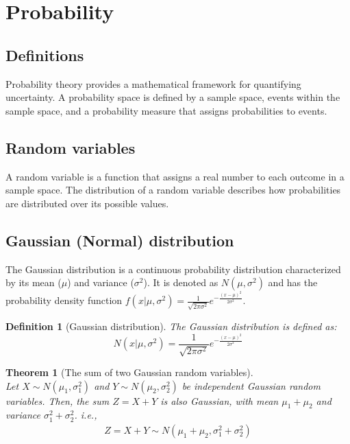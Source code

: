 \documentclass[11pt]{book} %
\newtheorem{theorem}{Theorem}[section]
\newtheorem{definition}{Definition}[section]
\begin{document}
\section{Probability}

\subsection{Definitions}

Probability theory provides a mathematical framework for quantifying uncertainty. 
A probability space is defined by a sample space, events within the sample space, and a probability measure that assigns probabilities to events.

\subsection{Random variables}

A random variable is a function that assigns a real number to each outcome in a sample space. 
The distribution of a random variable describes how probabilities are distributed over its possible values.

\subsection{Gaussian (Normal) distribution}

The Gaussian distribution is a continuous probability distribution characterized by its mean (\(\mu\)) and variance (\(\sigma^2\)). 
It is denoted as \(N(\mu, \sigma^2)\) and has the probability density function \(f(x | \mu, \sigma^2) = \frac{1}{\sqrt{2\pi\sigma^2}} e^{-\frac{(x-\mu)^2}{2\sigma^2}}\).

\begin{definition}[Gaussian distribution]
    The Gaussian distribution is defined as:
    \begin{equation}
        N(x | \mu, \sigma^2) = \frac{1}{\sqrt{2\pi\sigma^2}} e^{-\frac{(x-\mu)^2}{2\sigma^2}}
    \end{equation}
\end{definition}



\begin{theorem}[The sum of two Gaussian random variables]\ \\
    Let \(X \sim N(\mu_1, \sigma_1^2)\) and \(Y \sim N(\mu_2, \sigma_2^2)\) be independent Gaussian random variables. 
    Then, the sum \(Z = X + Y\) is also Gaussian, with mean \(\mu_1 + \mu_2\) and variance \(\sigma_1^2 + \sigma_2^2\). i.e., 
    \begin{align*}
        Z = X + Y \sim N(\mu_1 + \mu_2, \sigma_1^2 + \sigma_2^2)
    \end{align*}
\end{theorem}
\end{document}
